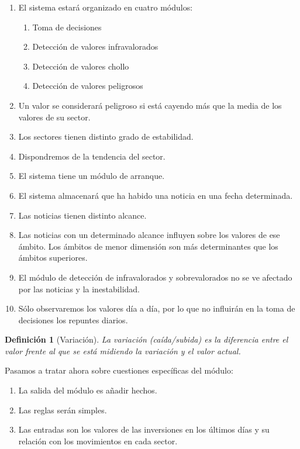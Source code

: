 \documentclass[11pt,leqno]{article}
\theoremstyle{definition_wo_parentheses}
\newtheorem{definicion}{Definición}[subsection]
\theoremstyle{plain}
\theoremstyle{remark}
\begin{document}
\begin{enumerate}
\item El sistema estará organizado en cuatro módulos:
	\begin{enumerate}[I]
	\item Toma de decisiones
	\item Detección de valores infravalorados
	\item Detección de valores chollo
	\item Detección de valores peligrosos
\end{enumerate}
\item Un valor se considerará peligroso si está cayendo más que la media de los valores de su sector.
\item Los sectores tienen distinto grado de estabilidad.
\item Dispondremos de la tendencia del sector.
\item El sistema tiene un módulo de arranque.
\item El sistema almacenará que ha habido una noticia en una fecha determinada.
\item Las noticias tienen distinto alcance. 
\item Las noticias con un determinado alcance influyen sobre los valores de ese ámbito. Los ámbitos de menor dimensión son más determinantes que los ámbitos superiores.
\item El módulo de detección de infravalorados y sobrevalorados no se ve afectado por las noticias y la inestabilidad.
\item Sólo observaremos los valores día a día, por lo que no influirán en la toma de decisiones los repuntes diarios.
\end{enumerate}
	
\begin{definicion}[Variación]
	La variación (caída/subida) es la diferencia entre el valor frente al que se está midiendo la variación y el valor actual.
\end{definicion} 

	Pasamos a tratar ahora sobre cuestiones específicas del módulo:
	
\begin{enumerate}
\item La salida del módulo es añadir hechos.
\item Las reglas serán simples.
\item Las entradas son los valores de las inversiones en los últimos días y su relación con los movimientos en cada sector.
\end{enumerate}
\end{document}
